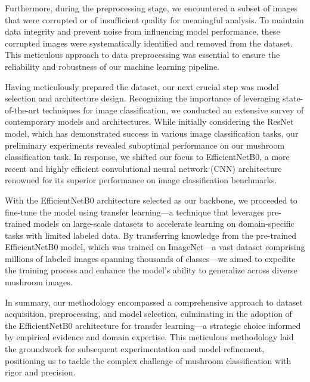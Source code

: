 Furthermore, during the preprocessing stage, we encountered a subset of images that were corrupted or of insufficient quality for meaningful analysis. To maintain data integrity and prevent noise from influencing model performance, these corrupted images were systematically identified and removed from the dataset. This meticulous approach to data preprocessing was essential to ensure the reliability and robustness of our machine learning pipeline.

Having meticulously prepared the dataset, our next crucial step was model selection and architecture design. Recognizing the importance of leveraging state-of-the-art techniques for image classification, we conducted an extensive survey of contemporary models and architectures. While initially considering the ResNet model, which has demonstrated success in various image classification tasks, our preliminary experiments revealed suboptimal performance on our mushroom classification task. In response, we shifted our focus to EfficientNetB0, a more recent and highly efficient convolutional neural network (CNN) architecture renowned for its superior performance on image classification benchmarks.

With the EfficientNetB0 architecture selected as our backbone, we proceeded to fine-tune the model using transfer learning—a technique that leverages pre-trained models on large-scale datasets to accelerate learning on domain-specific tasks with limited labeled data. By transferring knowledge from the pre-trained EfficientNetB0 model, which was trained on ImageNet—a vast dataset comprising millions of labeled images spanning thousands of classes—we aimed to expedite the training process and enhance the model's ability to generalize across diverse mushroom images.

In summary, our methodology encompassed a comprehensive approach to dataset acquisition, preprocessing, and model selection, culminating in the adoption of the EfficientNetB0 architecture for transfer learning—a strategic choice informed by empirical evidence and domain expertise. This meticulous methodology laid the groundwork for subsequent experimentation and model refinement, positioning us to tackle the complex challenge of mushroom classification with rigor and precision.

